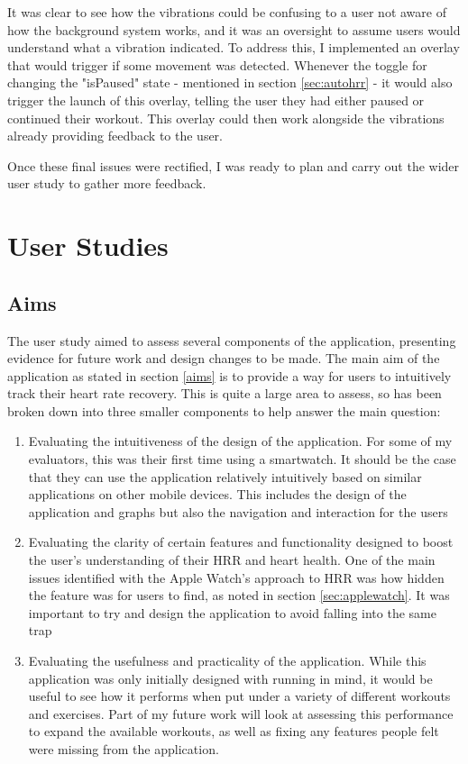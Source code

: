 \documentclass{l4proj}
\begin{document}
It was clear to see how the vibrations could be confusing to a user not aware of how the background system works, and it was an oversight to assume users would understand what a vibration indicated. To address this, I implemented an overlay that would trigger if some movement was detected. Whenever the toggle for changing the "isPaused" state - mentioned in section \ref{sec:autohrr} - it would also trigger the launch of this overlay, telling the user they had either paused or continued their workout. This overlay could then work alongside the vibrations already providing feedback to the user.

Once these final issues were rectified, I was ready to plan and carry out the wider user study to gather more feedback.

\section{User Studies}
\label{sec:userstudies}

\subsection{Aims}
\label{sec:userstudyaims}

The user study aimed to assess several components of the application, presenting evidence for future work and design changes to be made. The main aim of the application as stated in section \ref{aims} is to provide a way for users to intuitively track their heart rate recovery. This is quite a large area to assess, so has been broken down into three smaller components to help answer the main question:

\begin{enumerate}
    \item Evaluating the intuitiveness of the design of the application. For some of my evaluators, this was their first time using a smartwatch. It should be the case that they can use the application relatively intuitively based on similar applications on other mobile devices. This includes the design of the application and graphs but also the navigation and interaction for the users
    \item Evaluating the clarity of certain features and functionality designed to boost the user's understanding of their HRR and heart health. One of the main issues identified with the Apple Watch’s approach to HRR was how hidden the feature was for users to find, as noted in section \ref{sec:applewatch}. It was important to try and design the application to avoid falling into the same trap
    \item Evaluating the usefulness and practicality of the application. While this application was only initially designed with running in mind, it would be useful to see how it performs when put under a variety of different workouts and exercises. Part of my future work will look at assessing this performance to expand the available workouts, as well as fixing any features people felt were missing from the application.
\end{enumerate}
\end{document}
